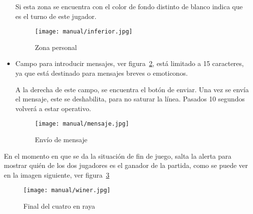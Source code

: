 \begin{itemize}
	Si esta zona se encuentra con el color de fondo distinto de blanco indica que es el turno de este jugador.
	
	\begin{figure}[H]
		\centering
		\texttt{[image: manual/inferior.jpg]}
		\caption{Zona personal}\label{fig:inferior}
	\end{figure}

	\item Campo para introducir mensajes, ver figura~\ref{fig:mensaje}, está limitado a 15 caracteres, ya que está destinado para mensajes breves o emoticonos.
	
	A la derecha de este campo, se encuentra el botón de enviar. Una vez se envía el mensaje, este se deshabilita, para no saturar la línea. Pasados 10 segundos volverá a estar operativo.
	
	\begin{figure}[H]
		\centering
		\texttt{[image: manual/mensaje.jpg]}
		\caption{Envío de mensaje}\label{fig:mensaje}
	\end{figure}
\end{itemize}

En el momento en que se da la situación de fin de juego, salta la alerta para mostrar quién de los dos jugadores es el ganador de la partida, como se puede ver en la imagen siguiente, ver figura~\ref{fig:finalcuatro}

\begin{figure}[H]
	\centering
	\texttt{[image: manual/winer.jpg]}
	\caption{Final del cuatro en raya}\label{fig:finalcuatro}
\end{figure} 